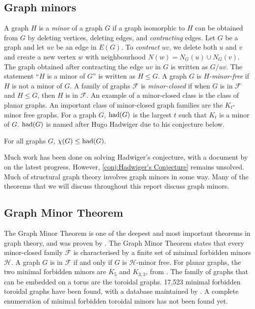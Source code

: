 \subsection{Graph minors}\label{sec:Graph Minors}
A graph \(H\) is a \textit{minor} of a graph \(G\) if a graph isomorphic to \(H\) can be obtained from \(G\) by deleting vertices, deleting edges, and \textit{contracting} edges. Let $G$ be a graph and let $uv$ be an edge in $E(G)$. To \textit{contract} \(uv\), we delete both \(u\) and \(v\) and create a new vertex \(w\) with neighbourhood \(N(w) = N_G(u) \cup N_G(v)\). The graph obtained after contracting the edge \(uv\) in $G$ is written as \(G/uv\).
The statement ``\(H\) is a minor of \(G\)'' is written as \(H \leq G\). A graph \(G\) is \textit{\(H\)-minor-free} if $H$ is not a minor of $G$. A family of graphs \(\mathcal{F}\) is \textit{minor-closed} if when $G$ is in \(\mathcal{F}\) and \(H \leq G\), then $H$ is in \(\mathcal{F}\).
An example of a minor-closed class is the class of planar graphs.
An important class of minor-closed graph families are the \(K_t\)-minor free graphs. For a graph \(G\), \(\operatorname{had}(G)\) is the largest \(t\) such that \(K_t\) is a minor of \(G\). $\operatorname{had}(G)$ is named after Hugo Hadwiger due to his conjecture below.

\begin{conjecture}\label{conj:Hadwiger's Conjecture}
	For all graphs \(G\), \(\chi(G) \leq \operatorname{had}(G)\).
\end{conjecture}
Much work has been done on solving Hadwiger's conjecture, with a document by \textcite{seymourHadwigerConjecture2016} on the latest progress. However, \cref{conj:Hadwiger's Conjecture} remains unsolved. Much of structural graph theory involves graph minors in some way. Many of the theorems that we will discuss throughout this report discuss graph minors. 

 \subsection{Graph Minor Theorem}
The Graph Minor Theorem is one of the deepest and most important theorems in graph theory, and was proven by \textcite{robertsonGraphMinorsXX2004}. The Graph Minor Theorem states that every minor-closed family $\mathcal{F}$ is characterised by a finite set of minimal forbidden minors $\mathcal{H}$. A graph $G$ is in $\mathcal{F}$ if and only if $G$ is $\mathcal{H}$-minor free.
For planar graphs, the two minimal forbidden minors are \(K_5\) and \(K_{3,3}\), from \textcite{wagnerUeberEigenschaftEbenen1937}. 
The family of graphs that can be embedded on a torus are the toroidal graphs.  17,523 minimal forbidden toroidal graphs have been found, with a database maintained by \textcite{myrvoldLargeSetTorus2018}. A complete enumeration of minimal forbidden toroidal minors has not been found yet.